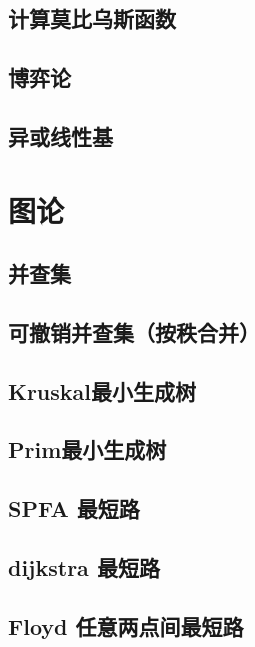 \section{计算莫比乌斯函数}
\raggedbottom
\hrulefill
\section{博弈论}
\raggedbottom
\hrulefill
\section{异或线性基}
\raggedbottom
\hrulefill

\chapter{图论}
\section{并查集}
\raggedbottom
\hrulefill
\section{可撤销并查集（按秩合并）}
\raggedbottom
\hrulefill
\section{Kruskal最小生成树}
\raggedbottom
\hrulefill
\section{Prim最小生成树}
\raggedbottom
\hrulefill
\section{SPFA 最短路}
\raggedbottom
\hrulefill
\section{dijkstra 最短路}
\raggedbottom
\hrulefill
\section{Floyd 任意两点间最短路}
\raggedbottom
\hrulefill
